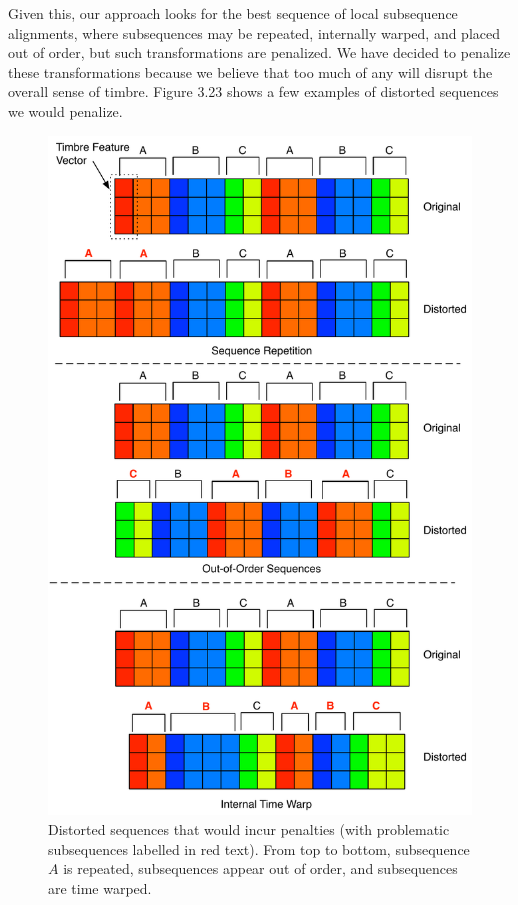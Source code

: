 \documentclass[12pt]{report} 	%
\numberwithin{figure}{chapter}
\numberwithin{table}{chapter}
\numberwithin{equation}{chapter}
\begin{document}
\begin{flushleft}
Given this, our approach looks for the best sequence of local subsequence alignments, where subsequences may be repeated, internally warped, and placed out of order, but such transformations are penalized. We have decided to penalize these transformations because we believe that too much of any will disrupt the overall sense of timbre. Figure 3.23 shows a few examples of distorted sequences we would penalize.
\begin{figure}[!p]
\begin{center}
\includegraphics[scale = 0.6]{SequencePenalties}
\caption[Proposed sequence similarity penalties]{Distorted sequences that would incur penalties (with problematic subsequences labelled in red text). From top to bottom, subsequence $A$ is repeated, subsequences appear out of order, and subsequences are time warped.}
\end{center}
\end{figure}


\end{flushleft}
\end{document}
